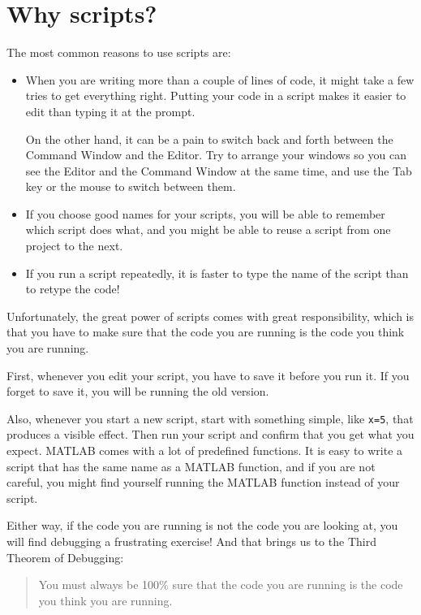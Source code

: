 \documentclass{book}
\begin{document}
\section{Why scripts?}

The most common reasons to use scripts are:

\begin{itemize}

\item When you are writing more than a couple of lines of code, it
might take a few tries to get everything right.  Putting your code
in a script makes it easier to edit than typing it at the prompt.

On the other hand, it can be a pain to switch back and forth between
the Command Window and the Editor.  Try to arrange your windows so
you can see the Editor and the Command Window at the same time, and
use the Tab key or the mouse to switch between them.

\item If you choose good names for your scripts, you will be able
to remember which script does what, and you might be able to reuse
a script from one project to the next.

\item If you run a script repeatedly, it is faster to type the
name of the script than to retype the code!

\end{itemize}

Unfortunately, the great power of scripts comes with great responsibility,
which is that you have to make sure that the code you are running is
the code you think you are running.

First, whenever you edit your script, you have to save it before you
run it.  If you forget to save it, you will be running the old version.

Also, whenever you start a new script, start with something simple,
like {\tt x=5}, that produces a visible effect.  Then run your script
and confirm that you get what you expect.  MATLAB comes with a lot of
predefined functions.  It is easy to write a script that has the same
name as a MATLAB function, and if you are not careful, you might
find yourself running the MATLAB function instead of your script.

Either way, if the code you are running is not the code you are looking
at, you will find debugging a frustrating exercise!  And that brings
us to the Third Theorem of Debugging:

\begin{quote}
You must always be 100\% sure that the code you are running is
the code you think you are running.
\end{quote}
\end{document}
